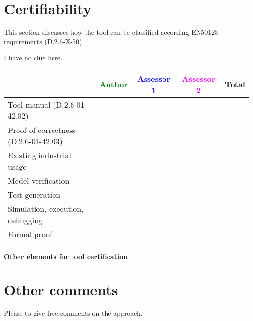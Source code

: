 \section{Certifiability}

This section discusses how the tool can be classified according EN50128 requirements (D.2.6-X-50).

\begin{author_comment}
  I have no clue here.
\end{author_comment}

\begin{tabular}{|l | c | c | c | c|}
\hline
& \textcolor{green}{Author} & \textcolor{blue}{Assessor 1} & \textcolor{magenta}{Assessor 2} & Total \\
\hline 
Tool manual (D.2.6-01-42.02) & & & &  \\
\hline
Proof of correctness (D.2.6-01-42.03)   & & & & \\
\hline
Existing industrial  usage  & & & & \\
\hline
Model verification & & & & \\
\hline
Test generation & & & & \\
\hline
Simulation, execution, debugging & & & & \\
\hline
Formal proof & & & & \\
\hline
\end{tabular}

\paragraph{Other elements for tool certification}

\section{Other comments}
Please to  give free comments on the approach.



